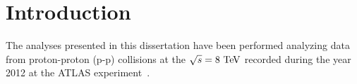 \clearpage{\pagestyle{empty}\cleardoublepage}

\chapter*{Introduction}\label{chap:intro}

The analyses presented in this dissertation have been performed analyzing data from 
proton-proton (p-p) collisions at the \cme $\rts=8\tev$ recorded during the year 2012 
at the ATLAS experiment~\cite{Aad:2008zzm}. 


